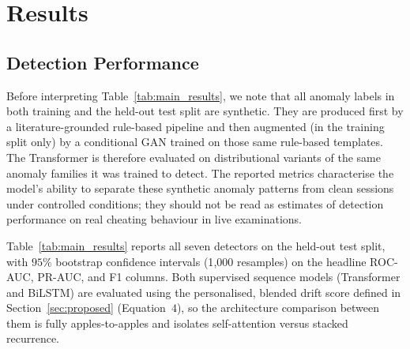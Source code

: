 \documentclass[sigconf]{acmart}
\begin{document}
\section{Results}
\label{sec:results}

\subsection{Detection Performance}
Before interpreting Table~\ref{tab:main_results}, we note that all anomaly labels in both training and the held-out test split are synthetic. They are produced first by a literature-grounded rule-based pipeline and then augmented (in the training split only) by a conditional GAN trained on those same rule-based templates. The Transformer is therefore evaluated on distributional variants of the same anomaly families it was trained to detect. The reported metrics characterise the model's ability to separate these synthetic anomaly patterns from clean sessions under controlled conditions; they should not be read as estimates of detection performance on real cheating behaviour in live examinations.

Table~\ref{tab:main_results} reports all seven detectors on the held-out test split, with $95\%$ bootstrap confidence intervals (1{,}000 resamples) on the headline ROC-AUC, PR-AUC, and F1 columns. Both supervised sequence models (Transformer and BiLSTM) are evaluated using the personalised, blended drift score defined in Section~\ref{sec:proposed} (Equation~$4$), so the architecture comparison between them is fully apples-to-apples and isolates self-attention versus stacked recurrence.
\end{document}
